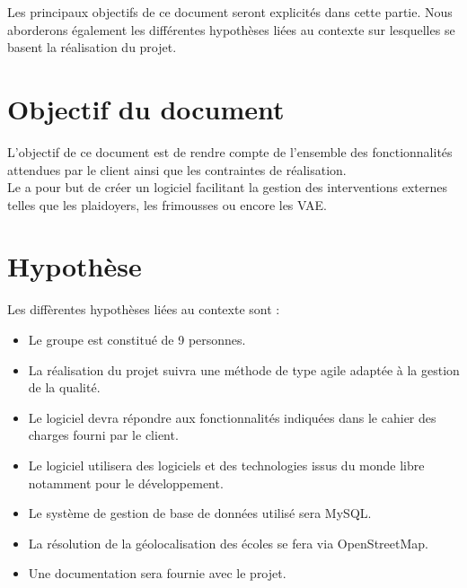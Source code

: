 	Les principaux objectifs de ce document seront explicités dans cette partie. Nous aborderons également les différentes hypothèses liées au contexte sur lesquelles se basent la réalisation du projet.


\section{Objectif du document}
	L'objectif de ce document est de rendre compte de l'ensemble des fonctionnalités attendues par le client ainsi que les contraintes de réalisation. \\
	
	Le \PICCourt \nomClient{} a pour but de créer un logiciel facilitant la gestion des interventions externes telles que les plaidoyers, les frimousses ou encore les VAE.
	
	
\section{Hypothèse}
	Les diffèrentes hypothèses liées au contexte sont :
	\begin{itemize}
		\item Le groupe \nomEquipe{} est constitué de 9 personnes.
		\item La réalisation du projet suivra une méthode de type agile adaptée à la gestion de la qualité.
		\item Le logiciel devra répondre aux fonctionnalités indiquées dans le cahier des charges fourni par le client.
		\item Le logiciel utilisera des logiciels et des technologies issus du monde libre notamment pour le développement.
		\item Le système de gestion de base de données utilisé sera MySQL.
		\item La résolution de la géolocalisation des écoles se fera via OpenStreetMap.
		\item Une documentation sera fournie avec le projet.
	\end{itemize}
	
